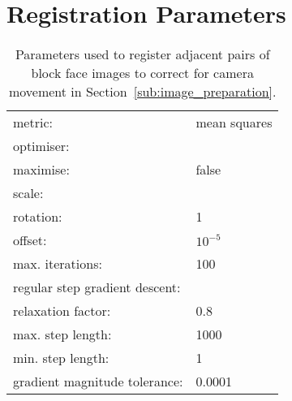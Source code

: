\chapter{Registration Parameters} %
\label{cha:registration_parameters}
  \begin{table}[h]
    \centering
    \begin{tabular}{|ll|}
      \hline
      metric: & mean squares \\
      \multicolumn{2}{|l|}{optimiser:} \\
      \quad maximise: & false\\
      \multicolumn{2}{|l|}{\quad scale:} \\
      \quad\quad rotation: & 1 \\
      \quad\quad offset: & $10^{-5}$ \\
      \quad max. iterations: & 100 \\
      \multicolumn{2}{|l|}{\quad regular step gradient descent:} \\
      \quad\quad relaxation factor: & 0.8 \\
      \quad\quad max. step length: & 1000 \\
      \quad\quad min. step length: & 1 \\
      \quad\quad gradient magnitude tolerance: & 0.0001 \\
      \hline
    \end{tabular}
      
    \caption{Parameters used to register adjacent pairs of block face images to correct for camera movement in Section~\ref{sub:image_preparation}.}
    \label{tab:block_face_to_block_face}
  \end{table}
  
